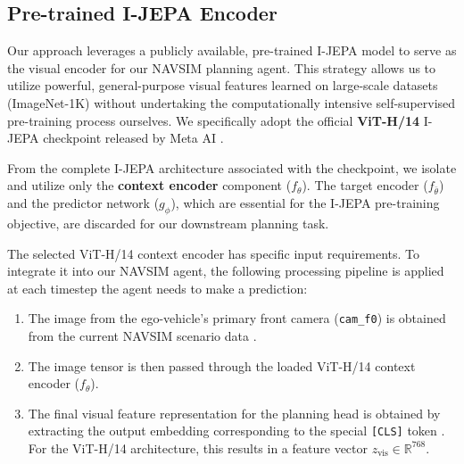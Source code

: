 \documentclass{article}
\begin{document}
\subsection{Pre-trained I-JEPA Encoder}
\label{subsec:encoder}
Our approach leverages a publicly available, pre-trained I-JEPA model to serve as the visual encoder for our NAVSIM planning agent. This strategy allows us to utilize powerful, general-purpose visual features learned on large-scale datasets (ImageNet-1K) without undertaking the computationally intensive self-supervised pre-training process ourselves. We specifically adopt the official \textbf{ViT-H/14} I-JEPA checkpoint released by Meta AI \cite{assran2023ijepa}.

From the complete I-JEPA architecture associated with the checkpoint, we isolate and utilize only the \textbf{context encoder} component ($f_\theta$). The target encoder ($f_{\bar{\theta}}$) and the predictor network ($g_\phi$), which are essential for the I-JEPA pre-training objective, are discarded for our downstream planning task.

The selected ViT-H/14 context encoder has specific input requirements. To integrate it into our NAVSIM agent, the following processing pipeline is applied at each timestep the agent needs to make a prediction:
\begin{enumerate}
    \item The image from the ego-vehicle's primary front camera (\texttt{cam\_f0}) is obtained from the current NAVSIM scenario data \cite{dauner2024navsim, OpenScene2023}.
    \item The image tensor is then passed through the loaded ViT-H/14 context encoder ($f_\theta$).
    \item The final visual feature representation for the planning head is obtained by extracting the output embedding corresponding to the special \texttt{[CLS]} token \cite{dosovitskiy2020vit}. For the ViT-H/14 architecture, this results in a feature vector $z_{\text{vis}} \in \mathbb{R}^{768}$.
\end{enumerate}
\end{document}
